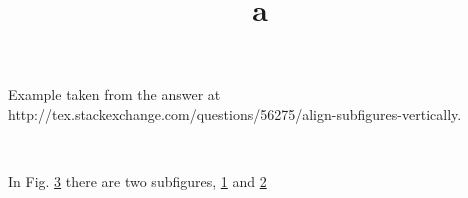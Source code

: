 \documentclass[a4paper,11pt]{article}
\title{a}
\author{}
\begin{document}
\maketitle

Example taken from the answer at http://tex.stackexchange.com/questions/56275/align-subfigures-vertically.

\begin{figure}[ht] \centering
        \begin{subfigure}{\textwidth}
                \centering
                \;
                \;
                \caption{}
                \label{fig:database}
        \end{subfigure}\\[2em]
        \begin{subfigure}[b]{\textwidth}
                \centering
                \caption{}
                \label{fig:partb}
        \end{subfigure}
        \caption{}\label{fig:query}
\end{figure}

In Fig. \ref{fig:query} there are two subfigures, \ref{fig:database} and \ref{fig:partb}
\end{document}
